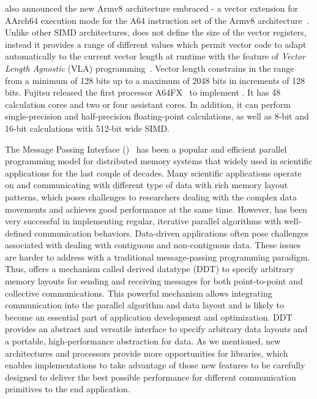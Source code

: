 \documentclass[conference]{IEEEtran}
\begin{document}
\arm also announced the new Armv8 architecture embraced \sve - a vector extension for AArch64
execution mode for the A64 instruction set of the
Armv8 architecture~\cite{arm-v8-ref, ARMv8-Architecture}.
Unlike other SIMD architectures, \sve does not define the size of
the vector registers, instead it provides a range of different values which permit vector
code to adapt automatically to the current vector length at runtime with the
feature of \emph{Vector Length Agnostic} (VLA) programming~\cite{Advanced-SIMD,vla-stencil}.
Vector length constrains in the range from a minimum of 128 bits up to
a maximum of 2048 bits in increments of 128 bits. Fujitsu released the first processor A64FX~\cite{fujitsugit}
to implement \sve. It has 48 calculation cores and two or four assistant cores. In addition, it can
perform single-precision and half-precision floating-point calculations, as well as 8-bit and
16-bit calculations with 512-bit wide SIMD.

The Message Passing Interface (\mpi)~\cite{mpi-forum} has been a popular
and efficient parallel programming model for distributed memory systems
that widely used in scientific applications for the last couple of decades.
Many scientific applications operate on and communicating with different type of data with rich memory layout patterns,
which poses challenges to researchers dealing with the complex data movements and achieves good performance at the same time.
However, \mpi has been very successful in implementing regular, iterative parallel algorithms with well-defined communication
behaviors. Data-driven applications often pose challenges associated with dealing
with contiguous and non-contiguous data.
These issues are harder to address with a traditional message-passing programming paradigm.
Thus, \mpi offers a mechanism called derived datatype (DDT) to specify arbitrary memory layouts
for sending and receiving messages for both point-to-point and collective communications. This powerful mechanism allows integrating communication into the parallel algorithm and data layout and is likely to become an essential part of application development and optimization.
DDT provides an abstract and versatile interface to specify arbitrary data layouts and a portable, high-performance abstraction for data. As we mentioned, new architectures and processors provide more opportunities for \mpi libraries, which enables \mpi implementations to take advantage of those new features to be carefully designed to deliver the best possible performance for different communication primitives to the end application.
\end{document}
